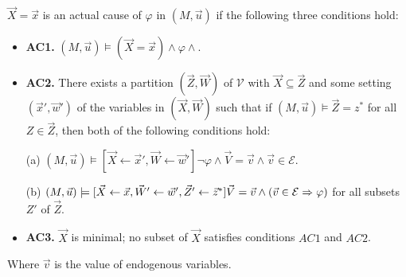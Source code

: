 \begin{definition}
    $\vec X = \vec x$ is an actual cause of $\varphi$ in $(M,\vec u)$ if the following three conditions hold:
    \begin{itemize}
        \item  \textbf{AC1.} $(M,\vec u)\models (\vec X = \vec x) \wedge \varphi \wedge $.
        \item  \textbf{AC2. }There exists a partition $(\vec Z, \vec W)$ of $\mathcal{V}$ with $\vec X \subseteq \vec Z$ and some setting $(\vec x',\vec w')$ of the variables in $(\vec X,\vec W)$ such that if $(M,\vec u)\models \vec Z = z^*$ for all $Z\in \vec Z$, then both of the following conditions hold:

              (a) $(M,\vec u)\models[\vec X \leftarrow \vec x', \vec W \leftarrow \vec w']\neg \varphi 
              \wedge \vec V = \vec v
              \wedge  \vec v \in \mathcal{E}$.

              (b) $(M,\vec u)\models[\vec X\leftarrow \vec x, \vec W' 
              \leftarrow \vec w', \vec Z'\leftarrow \vec z^*]
              \vec V = \vec v \wedge (\vec v \in \mathcal{E} \Rightarrow \varphi)$
                  for all subsets $Z'$ of $\vec Z$.

        \item  \textbf{AC3.} $\vec X$ is minimal; no subset of $\vec X$ satisfies conditions $AC1$ and $AC2$.
    \end{itemize}
    Where $\vec v$ is the value of endogenous variables.
\end{definition}
